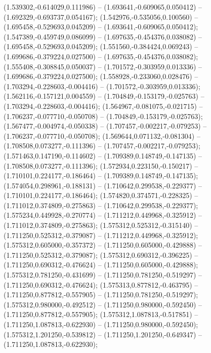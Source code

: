 (1.539302,-0.614029,0.111986) -- (1.693641,-0.609065,0.050412) -- (1.692329,-0.693737,0.054167);
 (1.542976,-0.535056,0.100560) -- (1.695458,-0.529693,0.045209) -- (1.693641,-0.609065,0.050412);
 (1.547389,-0.459749,0.086099) -- (1.697635,-0.454376,0.038082) -- (1.695458,-0.529693,0.045209);
 (1.551560,-0.384424,0.069243) -- (1.699686,-0.379224,0.027500) -- (1.697635,-0.454376,0.038082);
 (1.555408,-0.308845,0.050037) -- (1.701572,-0.303959,0.013336) -- (1.699686,-0.379224,0.027500);
 (1.558928,-0.233060,0.028476) -- (1.703294,-0.228603,-0.004416) -- (1.701572,-0.303959,0.013336);
 (1.562116,-0.157121,0.004559) -- (1.704849,-0.153179,-0.025763) -- (1.703294,-0.228603,-0.004416);
 (1.564967,-0.081075,-0.021715) -- (1.706237,-0.077710,-0.050708) -- (1.704849,-0.153179,-0.025763);
 (1.567477,-0.004974,-0.050338) -- (1.707457,-0.002217,-0.079253) -- (1.706237,-0.077710,-0.050708);
 (1.569644,0.071132,-0.081304) -- (1.708508,0.073277,-0.111396) -- (1.707457,-0.002217,-0.079253);
 (1.571463,0.147190,-0.114602) -- (1.709389,0.148749,-0.147135) -- (1.708508,0.073277,-0.111396);
 (1.572934,0.223150,-0.150217) -- (1.710101,0.224177,-0.186464) -- (1.709389,0.148749,-0.147135);
 (1.574054,0.298961,-0.188131) -- (1.710642,0.299538,-0.229377) -- (1.710101,0.224177,-0.186464);
 (1.574820,0.374571,-0.228325) -- (1.711012,0.374809,-0.275863) -- (1.710642,0.299538,-0.229377);
 (1.575234,0.449928,-0.270774) -- (1.711212,0.449968,-0.325912) -- (1.711012,0.374809,-0.275863);
 (1.575312,0.525312,-0.315140) -- (1.711250,0.525312,-0.379087) -- (1.711212,0.449968,-0.325912);
 (1.575312,0.605000,-0.357372) -- (1.711250,0.605000,-0.429888) -- (1.711250,0.525312,-0.379087);
 (1.575312,0.690312,-0.396225) -- (1.711250,0.690312,-0.476624) -- (1.711250,0.605000,-0.429888);
 (1.575312,0.781250,-0.431699) -- (1.711250,0.781250,-0.519297) -- (1.711250,0.690312,-0.476624);
 (1.575313,0.877812,-0.463795) -- (1.711250,0.877812,-0.557905) -- (1.711250,0.781250,-0.519297);
 (1.575312,0.980000,-0.492512) -- (1.711250,0.980000,-0.592450) -- (1.711250,0.877812,-0.557905);
 (1.575312,1.087813,-0.517851) -- (1.711250,1.087813,-0.622930) -- (1.711250,0.980000,-0.592450);
 (1.575312,1.201250,-0.539812) -- (1.711250,1.201250,-0.649347) -- (1.711250,1.087813,-0.622930);
